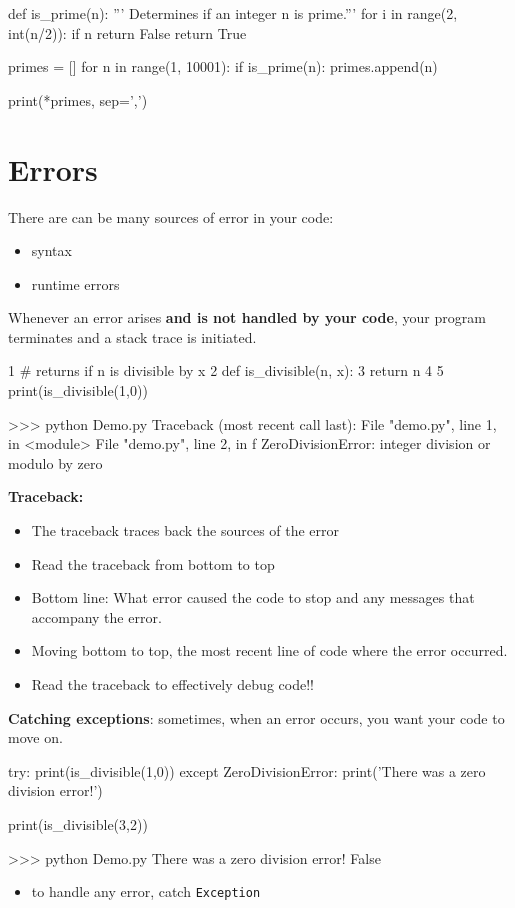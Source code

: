 \documentclass[12pt]{article}
\numberwithin{equation}{section}
\begin{document}
\begin{python}
def is_prime(n):
	''' Determines if an integer n is prime.'''
    for i in range(2, int(n/2)):
        if n%
            return False
    return True

primes = []
for n in range(1, 10001):
    if is_prime(n):
        primes.append(n)

print(*primes, sep=',')
\end{python}

\section{Errors}
There are can be many sources of error in your code:
\begin{itemize}
    \item syntax
    \item runtime errors
\end{itemize}
Whenever an error arises \textbf{and is not handled by your code}, your program terminates and a stack trace is initiated.

\begin{python}
1 # returns if n is divisible by x
2 def is_divisible(n, x):
3 	return n%
4 
5 print(is_divisible(1,0))

>>> python Demo.py
Traceback (most recent call last):
  File "demo.py", line 1, in <module>
  File "demo.py", line 2, in f
ZeroDivisionError: integer division or modulo by zero
\end{python}

\textbf{Traceback:}
\begin{itemize}
    \item The traceback traces back the sources of the error
    \item Read the traceback from bottom to top
    \item Bottom line: What error caused the code to stop and any messages that accompany the error. 
    \item Moving bottom to top, the most recent line of code where the error occurred.
    \item Read the traceback to effectively debug code!!
\end{itemize}

\textbf{Catching exceptions}: sometimes, when an error occurs, you want your code to move on.
\begin{python}
try:
    print(is_divisible(1,0))
except ZeroDivisionError:
    print('There was a zero division error!')

print(is_divisible(3,2))

>>> python Demo.py
There was a zero division error! 
False
\end{python}
\begin{itemize}
    \item to handle any error, catch \verb|Exception|
\end{itemize}
\end{document}
